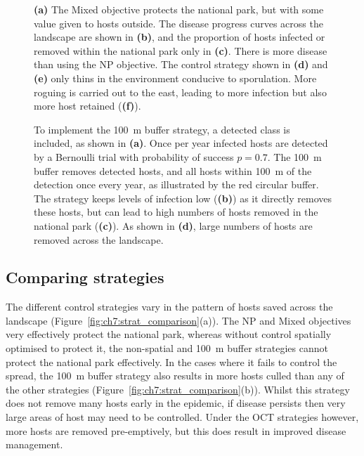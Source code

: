 {\begin{figure}[H]
    \begin{center}
        \caption[Optimal control strategy using the Mixed objective]{\textbf{(a)} The Mixed objective protects the national park, but with some value given to hosts outside. The disease progress curves across the landscape are shown in \textbf{(b)}, and the proportion of hosts infected or removed within the national park only in \textbf{(c)}. There is more disease than using the NP objective. The control strategy shown in \textbf{(d)} and \textbf{(e)} only thins in the environment conducive to sporulation. More roguing is carried out to the east, leading to more infection but also more host retained (\textbf{(f)}).\label{fig:ch7:ol_mixed}}
    \end{center}
\end{figure}
}

\begin{figure}
    \begin{center}
        \caption[\SI{100}{\meter} buffer zone strategy]{To implement the \SI{100}{\meter} buffer strategy, a detected class is included, as shown in \textbf{(a)}. Once per year infected hosts are detected by a Bernoulli trial with probability of success $p=0.7$. The \SI{100}{\meter} buffer removes detected hosts, and all hosts within \SI{100}{\meter} of the detection once every year, as illustrated by the red circular buffer. The strategy keeps levels of infection low (\textbf{(b)}) as it directly removes these hosts, but can lead to high numbers of hosts removed in the national park (\textbf{(c)}). As shown in \textbf{(d)}, large numbers of hosts are removed across the landscape.\label{fig:ch7:100m_buffer}}
    \end{center}
\end{figure}

\FloatBarrier
\subsection{Comparing strategies}

The different control strategies vary in the pattern of hosts saved across the landscape (Figure~\ref{fig:ch7:strat_comparison}(a)). The NP and Mixed objectives very effectively protect the national park, whereas without control spatially optimised to protect it, the non-spatial and \SI{100}{\meter} buffer strategies cannot protect the national park effectively. In the cases where it fails to control the spread, the \SI{100}{\meter} buffer strategy also results in more hosts culled than any of the other strategies (Figure~\ref{fig:ch7:strat_comparison}(b)). Whilst this strategy does not remove many hosts early in the epidemic, if disease persists then very large areas of host may need to be controlled. Under the OCT strategies however, more hosts are removed pre-emptively, but this does result in improved disease management.

